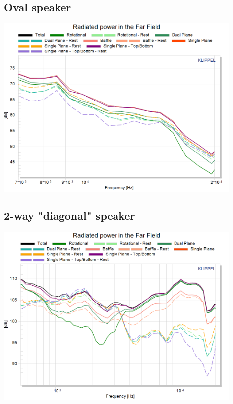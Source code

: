 \documentclass{report}
\begin{document}
\begin{appendices}
\subsection{Oval speaker}
\label{Curves:oval}
\begin{center}
	\includegraphics[width=0.9\textwidth]{Appendix/Rad_Pow_OvalSpkr_ZoomHF}
    \captionsetup{hypcap=false}
\end{center}

\subsection{2-way "diagonal" speaker}

\begin{center}
	\includegraphics[width=0.9\textwidth]{Appendix/Rad_Pow_BnO_ZoomHF}
    \captionsetup{hypcap=false}
    \label{Curves:2way}
\end{center}



\end{appendices}
\end{document}
